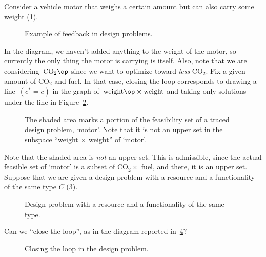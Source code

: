 \begin{example}Consider a vehicle motor that weighs a certain amount but can also carry some weight (\cref{fig:examplefeedback}).
\begin{figure}[h!]
\begin{center}
\end{center}
\caption{Example of feedback in design problems. \label{fig:examplefeedback}}
\end{figure}
In the diagram, we haven't added anything to the weight of the motor, so currently the only thing the motor is carrying is itself. Also, note that we are considering~$\text{CO}_2\op$ since we want to optimize toward \emph{less} CO$_2$. Fix a given amount of CO$_2$ and fuel. In that case, closing the loop corresponds to drawing a line~$(c^\ast = c)$ in the graph of~$\text{weight}\op \times \text{weight}$ and taking only solutions under the line in Figure~\ref{fig:weightcarrier}.
\begin{figure}[h!]
\centering
{}
\caption{The shaded area marks a portion of the feasibility set of a traced design problem, `motor'. Note that it is not an upper set in the subspace ``weight $\times$ weight'' of `motor'.}
\label{fig:weightcarrier}
\end{figure}
\end{example}

Note that the shaded area is \emph{not} an upper set. This is admissible, since the actual feasible set of `motor' is a subset of CO$_2 \times$ fuel, and there, it is an upper set.
Suppose that we are given a design problem with a resource and a functionality of the same type $C$ (\cref{fig:extrace_1}).

\begin{figure}[h!]
\begin{center}
\end{center}
\caption{Design problem with a resource and a functionality of the same type. \label{fig:extrace_1}}
\end{figure}

Can we ``close the loop'', as in the diagram reported in~\cref{fig:extrace_2}?
\begin{figure}[h!]
\begin{center}
\end{center}
\caption{Closing the loop in the design problem. \label{fig:extrace_2}}
\end{figure}

